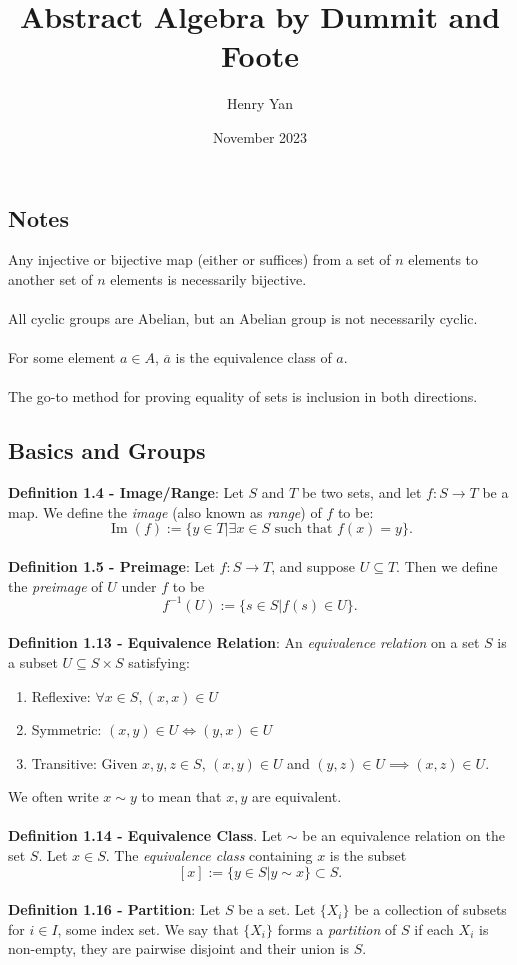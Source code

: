 \documentclass{article}
\title{Abstract Algebra by Dummit and Foote}
\author{Henry Yan}
\date{November 2023}
\DeclareMathOperator{\im}{Im}
\begin{document}
\maketitle

\subsection*{Notes}
Any injective or bijective map (either or suffices) from a set of $n$ elements to another set of $n$ elements is necessarily bijective. \\ \\
All cyclic groups are Abelian, but an Abelian group is not necessarily cyclic. \\ \\
For some element $a \in A$, $\overline{a}$ is the equivalence class of $a$. \\ \\
The go-to method for proving equality of sets is inclusion in both directions.
\subsection*{Basics and Groups}
\textbf{Definition 1.4 - Image/Range}: Let $S$ and $T$ be two sets, and let $f: S \rightarrow T$ be a map. We define the \textit{image} (also known as \textit{range}) of $f$ to be: $$\im(f) := \{y \in T | \exists x \in S \text{ such that } f(x) = y\}.$$ \\
\textbf{Definition 1.5 - Preimage}: Let $f: S \rightarrow T$, and suppose $U \subseteq T$. Then we define the \textit{preimage} of $U$ under $f$ to be $$f^{-1}(U) := \{s \in S | f(s) \in U\}.$$ \\
\textbf{Definition 1.13 - Equivalence Relation}: An \textit{equivalence relation} on a set $S$ is a subset $U \subseteq S \times S$ satisfying: \begin{enumerate}
        \item Reflexive: $\forall x \in S, (x, x) \in U$
    \item Symmetric: $(x, y) \in U \iff (y, x) \in U$
    \item Transitive: Given $ x, y, z \in S$, $(x, y) \in U$ and $(y, z) \in U \implies (x, z) \in U$.
\end{enumerate} We often write $x \sim y$ to mean that $x, y$ are equivalent. \\ \\
\textbf{Definition 1.14 - Equivalence Class}. Let $\sim$ be an equivalence relation on the set $S$. Let $x \in S$. The \textit{equivalence class} containing $x$ is the subset $$[x] := \{y \in S | y \sim x\} \subset S.$$ \\
\textbf{Definition 1.16 - Partition}: Let $S$ be a set. Let $\{X_i\}$ be a collection of subsets for $i \in I$, some index set. We say that $\{X_i\}$ forms a \textit{partition} of $S$ if each $X_i$ is non-empty, they are pairwise disjoint and their union is $S$.
\end{document}
